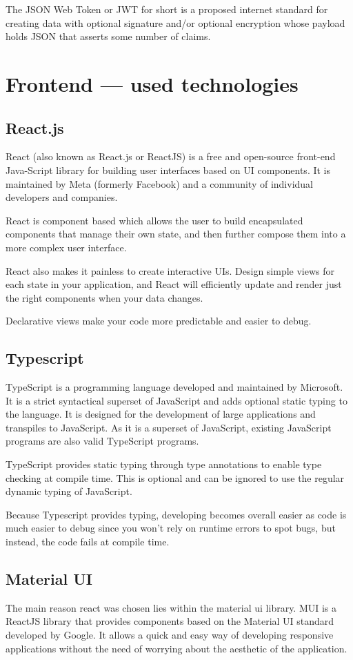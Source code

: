 The JSON Web Token or JWT for short is a proposed internet standard for creating data with optional signature and/or optional encryption whose payload holds JSON that asserts some number of claims.
\section{Frontend --- used technologies}
\subsection{React.js}
React (also known as React.js or ReactJS) is a free and open-source front-end Java-Script library for building user interfaces based on UI components. It is maintained by Meta (formerly Facebook) and a community of individual developers and companies.

React is component based which allows the user to build encapsulated components that manage their own state, and then further compose them into a more complex user interface.

React also makes it painless to create interactive UIs. Design simple views for each state in your application, and React will efficiently update and render just the right components when your data changes. \cite{reactJs}

Declarative views make your code more predictable and easier to debug.

\subsection{Typescript}
TypeScript is a programming language developed and maintained by Microsoft. It is a strict syntactical superset of JavaScript and adds optional static typing to the language. It is designed for the development of large applications and transpiles to JavaScript. As it is a superset of JavaScript, existing JavaScript programs are also valid TypeScript programs. 

TypeScript provides static typing through type annotations to enable type checking at compile time. This is optional and can be ignored to use the regular dynamic typing of JavaScript. 

Because Typescript provides typing, developing becomes overall easier as code is much easier to debug since you won't rely on runtime errors to spot bugs, but instead, the code fails at compile time.

\subsection{Material UI}
The main reason react was chosen lies within the material ui library. MUI is a ReactJS library that provides components based on the Material UI standard developed by Google. It allows a quick and easy way of developing responsive applications without the need of worrying about the aesthetic of the application.

